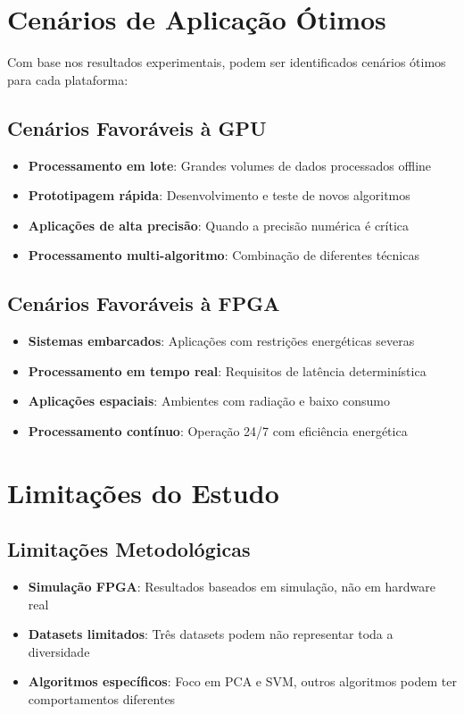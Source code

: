 \section{Cenários de Aplicação Ótimos}\label{sec:cenarios_otimos}

Com base nos resultados experimentais, podem ser identificados cenários ótimos para cada plataforma:

\subsection{Cenários Favoráveis à GPU}
\begin{itemize}
    \item \textbf{Processamento em lote}: Grandes volumes de dados processados offline
    \item \textbf{Prototipagem rápida}: Desenvolvimento e teste de novos algoritmos
    \item \textbf{Aplicações de alta precisão}: Quando a precisão numérica é crítica
    \item \textbf{Processamento multi-algoritmo}: Combinação de diferentes técnicas
\end{itemize}

\subsection{Cenários Favoráveis à FPGA}
\begin{itemize}
    \item \textbf{Sistemas embarcados}: Aplicações com restrições energéticas severas
    \item \textbf{Processamento em tempo real}: Requisitos de latência determinística
    \item \textbf{Aplicações espaciais}: Ambientes com radiação e baixo consumo
    \item \textbf{Processamento contínuo}: Operação 24/7 com eficiência energética
\end{itemize}

\section{Limitações do Estudo}\label{sec:limitacoes}

\subsection{Limitações Metodológicas}
\begin{itemize}
    \item \textbf{Simulação FPGA}: Resultados baseados em simulação, não em hardware real
    \item \textbf{Datasets limitados}: Três datasets podem não representar toda a diversidade
    \item \textbf{Algoritmos específicos}: Foco em PCA e SVM, outros algoritmos podem ter comportamentos diferentes
\end{itemize}

